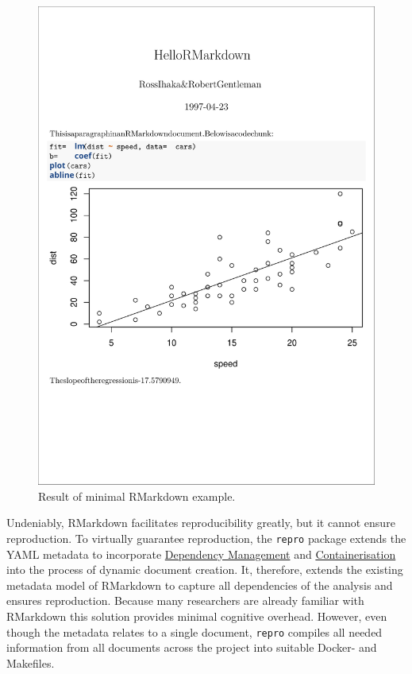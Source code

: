 \documentclass[12pt,a4paper,twoside]{article}
\begin{document}
\begin{figure}

{\centering \includegraphics[width=1\linewidth]{images/rmarkdown} 

}

\caption{Result of minimal RMarkdown example.}\label{fig:rmarkdown}
\end{figure}

Undeniably, RMarkdown facilitates reproducibility greatly, but it cannot ensure reproduction.
To virtually guarantee reproduction, the \texttt{repro} package extends the YAML metadata to incorporate \protect\hyperlink{dependency-management}{Dependency Management} and \protect\hyperlink{containerisation}{Containerisation} into the process of dynamic document creation.
It, therefore, extends the existing metadata model of RMarkdown to capture all dependencies of the analysis and ensures reproduction.
Because many researchers are already familiar with RMarkdown this solution provides minimal cognitive overhead.
However, even though the metadata relates to a single document, \texttt{repro} compiles all needed information from all documents across the project into suitable Docker- and Makefiles.
\end{document}
